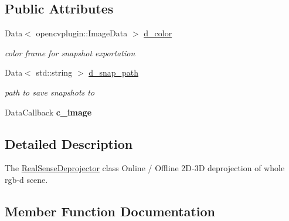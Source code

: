 \subsection*{Public Attributes}
\begin{DoxyCompactItemize}
\item 
\mbox{\label{classsofa_1_1rgbdtracking_1_1_real_sense_deprojector_a61d80c84f736effdb2ecbd41000b1bea}} 
Data$<$ opencvplugin\+::\+Image\+Data $>$ \hyperlink{classsofa_1_1rgbdtracking_1_1_real_sense_deprojector_a61d80c84f736effdb2ecbd41000b1bea}{d\+\_\+color}
\begin{DoxyCompactList}\small\item\em color frame for snapshot exportation \end{DoxyCompactList}\item 
\mbox{\label{classsofa_1_1rgbdtracking_1_1_real_sense_deprojector_ae6f6cf6fff6c3cc81e1370d17b627395}} 
Data$<$ std\+::string $>$ \hyperlink{classsofa_1_1rgbdtracking_1_1_real_sense_deprojector_ae6f6cf6fff6c3cc81e1370d17b627395}{d\+\_\+snap\+\_\+path}
\begin{DoxyCompactList}\small\item\em path to save snapshots to \end{DoxyCompactList}\item 
\mbox{\label{classsofa_1_1rgbdtracking_1_1_real_sense_deprojector_a718873322b7771e3ddf7fa1da705ca6f}} 
Data\+Callback {\bfseries c\+\_\+image}
\end{DoxyCompactItemize}


\subsection{Detailed Description}
The \hyperlink{classsofa_1_1rgbdtracking_1_1_real_sense_deprojector}{Real\+Sense\+Deprojector} class Online / Offline 2\+D-\/3D deprojection of whole rgb-\/d scene. 

\subsection{Member Function Documentation}
\mbox{\label{classsofa_1_1rgbdtracking_1_1_real_sense_deprojector_aaa5648b58d79dcabc8265d7eec19b78a}} 
